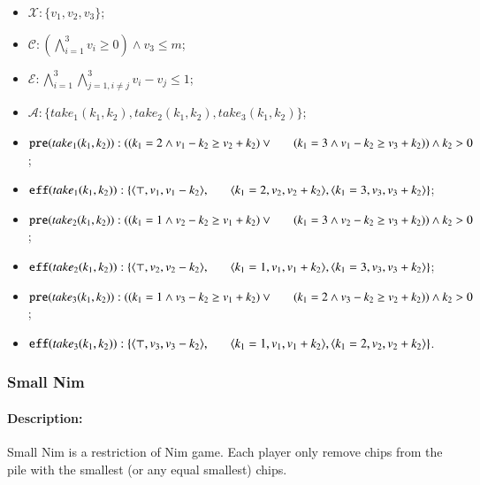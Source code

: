 \documentclass[review]{elsarticle}
\newcommand{\set}[1]{\{ #1 \}}
\newcommand{\tuple}[1]{\langle {#1} \rangle}
\newcommand{\true}{\top}
\newcommand{\statevar}{\mathcal{X}}
\newcommand{\act}{\mathcal{A}}
\newcommand{\constraint}{\mathcal{C}}
\newcommand{\estate}{\mathcal{E}}
\newcommand{\pre}{\mathtt{pre}}
\newcommand{\eff}{\mathtt{eff}}
\begin{document}
\begin{itemize}
	\item $\statevar: \set{v_1, v_2, v_3}$;
	\item $\constraint:(\bigwedge_{i=1}^{3} v_i \ge 0) \wedge v_3 \le m$;
	\item $\estate:\bigwedge_{i=1}^{3}\bigwedge_{j=1,i\neq j}^{3} v_i - v_j \le 1$;
	\item $\act:\set{take_1(k_1, k_2),take_2(k_1, k_2),take_3(k_1, k_2)}$;
	\item $\pre(take_1(k_1, k_2)) : ( (k_1 = 2 \wedge v_1-k_2 \ge v_2 +k_2)\vee \\ \hspace*{6mm}
	(k_1 = 3 \wedge 
	v_1-k_2 \ge v_3 +k_2 )) \wedge k_2 > 0$;
	\item $\eff(take_1(k_1, k_2)) : \set{\tuple{\true, v_1, v_1-k_2},\\ \hspace*{6mm}
		\tuple{k_1 = 2, v_2, v_2+k_2}, \tuple{k_1 = 3, v_3, v_3+k_2}}$;
	\item $\pre(take_2(k_1, k_2)) : ( (k_1 = 1 \wedge v_2-k_2 \ge v_1 +k_2)\vee \\ \hspace*{6mm}
	(k_1 = 3 \wedge
	v_2-k_2 \ge v_3 +k_2 )) \wedge k_2 > 0$;
	\item $\eff(take_2(k_1, k_2)) : \set{\tuple{\true, v_2, v_2-k_2}, \\ \hspace*{6mm}
		\tuple{k_1 = 1, v_1, v_1+k_2}, \tuple{k_1 = 3, v_3, v_3+k_2}}$;
	\item $\pre(take_3(k_1, k_2)) : ( (k_1 = 1 \wedge v_3-k_2 \ge v_1 +k_2)\vee \\ \hspace*{6mm}
	(k_1 = 2 \wedge
	v_3-k_2 \ge v_2 +k_2 )) \wedge k_2 > 0$;
	\item $\eff(take_3(k_1, k_2)) : \set{\tuple{\true, v_3, v_3-k_2}, \\ \hspace*{6mm}
		\tuple{k_1 = 1, v_1, v_1+k_2}, \tuple{k_1 = 2, v_2, v_2+k_2}}$.
\end{itemize}

\subsubsection{Small Nim \protect\cite{BerCG2001}}

\paragraph{Description:} 
Small Nim is a restriction of Nim game.
Each player only remove chips from the pile with the smallest (or any equal smallest) chips.
\end{document}
